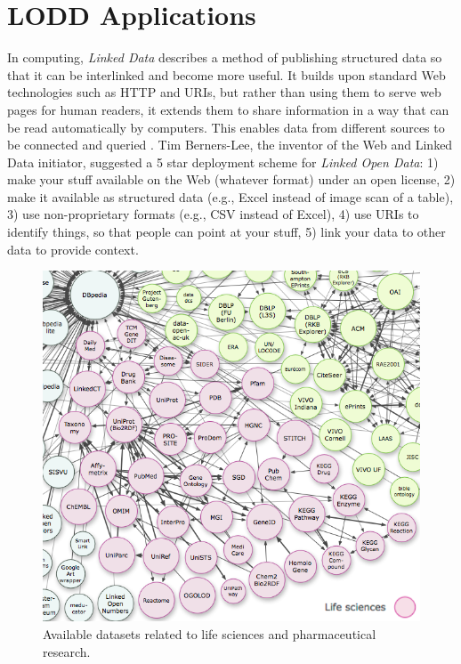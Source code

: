 \documentclass[journal]{IEEEtran}
\begin{document}
\section{LODD Applications}
\label{sec:lod}

In computing, \emph{Linked Data} describes a method of publishing structured data so that it can be interlinked and become more useful.
It builds upon standard Web technologies such as HTTP and URIs, but rather than using them to serve web pages for human readers, it extends them to share information in a way that can be read automatically by computers.
This enables data from different sources to be connected and queried \cite{linkeddata}.
Tim Berners-Lee, the inventor of the Web and Linked Data initiator, suggested a 5 star deployment scheme for \emph{Linked Open Data}:
1) make your stuff available on the Web (whatever format) under an open license,
2) make it available as structured data (e.g., Excel instead of image scan of a table),
3) use non-proprietary formats (e.g., CSV instead of Excel),
4) use URIs to identify things, so that people can point at your stuff,
5) link your data to other data to provide context.

\begin{figure}[tb]
	\centering
		\includegraphics[width=1.0\columnwidth]{images/lod_cloud.png}
	\caption{Available datasets related to life sciences and pharmaceutical research.}
	\label{fig:lod}
\end{figure}
\end{document}
